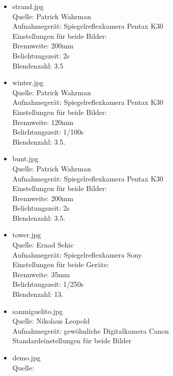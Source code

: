 \documentclass[deutsch]{scrartcl}
\begin{document}
\begin{itemize}
	\item strand.jpg\\
		Quelle: Patrick Wahrman\\
		Aufnahmegerät: Spiegelreflexkamera Pentax K30 \\
		Einstellungen für beide Bilder: \\
		Brennweite: 200mm \\
		Belichtungszeit: 2s \\
		Blendenzahl: 3.5

	\item winter.jpg\\
		Quelle: Patrick Wahrman\\
		Aufnahmegerät: Spiegelreflexkamera Pentax K30 \\
		Einstellungen für beide Bilder: \\
		Brennweite: 120mm \\
		Belichtungszeit: 1/100s \\
		Blendenzahl: 3.5.

	\item bunt.jpg\\
		Quelle: Patrick Wahrman\\
		Aufnahmegerät: Spiegelreflexkamera Pentax K30 \\
		Einstellungen für beide Bilder: \\
		Brennweite: 200mm \\
		Belichtungszeit: 2s\\
		Blendenzahl: 3.5.

	\item tower.jpg\\
		Quelle: Ernad Sehic\\
		Aufnahmegerät: Spiegelreflexkamera Sony \\
		Einstellungen für beide Geräte: \\
		Brennweite: 35mm \\
		Belichtungszeit: 1/250s \\
		Blendenzahl: 13.

	\item sanmiguelito.jpg\\
		Quelle: Nikolaus Leopold \\
		Aufnahmegerät: gewöhnliche Digitalkamera Canon\\
		Standardeinstellungen für beide Bilder

	\item demo.jpg\\
		Quelle: \cite{pandemo}


\end{itemize}
\end{document}
